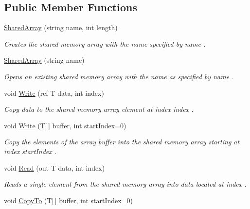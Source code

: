 \subsection*{Public Member Functions}
\begin{DoxyCompactItemize}
\item 
\hyperlink{class_shared_memory_1_1_shared_array_a040ca6a2363a476b8d70ede86470c527}{Shared\+Array} (string name, int length)
\begin{DoxyCompactList}\small\item\em Creates the shared memory array with the name specified by {\itshape name} . \end{DoxyCompactList}\item 
\hyperlink{class_shared_memory_1_1_shared_array_a37348ea74c68aa8b6ac66ac086a7dbe5}{Shared\+Array} (string name)
\begin{DoxyCompactList}\small\item\em Opens an existing shared memory array with the name as specified by {\itshape name} . \end{DoxyCompactList}\item 
void \hyperlink{class_shared_memory_1_1_shared_array_af68d1184f8bb367b46dff81642abf6e5}{Write} (ref T data, int index)
\begin{DoxyCompactList}\small\item\em Copy {\itshape data}  to the shared memory array element at index {\itshape index} . \end{DoxyCompactList}\item 
void \hyperlink{class_shared_memory_1_1_shared_array_a0768d39e8f999328b650b64b219b16b5}{Write} (T\mbox{[}$\,$\mbox{]} buffer, int start\+Index=0)
\begin{DoxyCompactList}\small\item\em Copy the elements of the array {\itshape buffer}  into the shared memory array starting at index {\itshape start\+Index} . \end{DoxyCompactList}\item 
void \hyperlink{class_shared_memory_1_1_shared_array_ad93f0d40221e0a32b0e865f7d6f0a159}{Read} (out T data, int index)
\begin{DoxyCompactList}\small\item\em Reads a single element from the shared memory array into {\itshape data}  located at {\itshape index} . \end{DoxyCompactList}\item 
void \hyperlink{class_shared_memory_1_1_shared_array_a6aef540c714d2348e4cc071ad57fc918}{Copy\+To} (T\mbox{[}$\,$\mbox{]} buffer, int start\+Index=0)

\end{DoxyCompactItemize}
